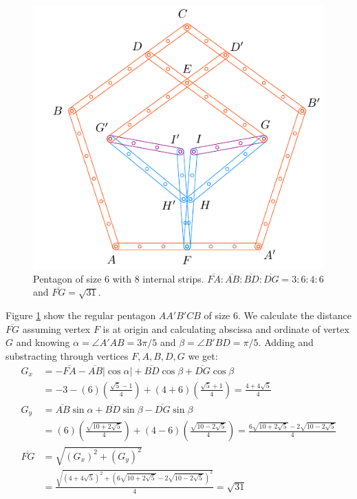 \documentclass[11pt]{article}
\begin{document}
\begin{figure}[H]
\centering
\includegraphics[scale=1.2]{6/penta6-8b}
\caption{Pentagon of size 6 with 8 internal strips. $\overline{FA} : \overline{AB} : \overline{BD} : \overline{DG} = 3:6:4:6$ and $\overline{FG} = \sqrt{31}$.}
\label{fig:penta6-8b}
\end{figure}

Figure \ref{fig:penta6-8b} show the regular pentagon $AA'B'CB$ of size $6$. We calculate the distance $\overline{FG}$ assuming vertex $F$ is at origin and calculating abscissa and ordinate of vertex $G$ and knowing $\alpha = \angle{A'AB} = 3\pi / 5$ and $\beta = \angle{B'BD} = \pi / 5$. Adding and substracting through vertices $F,A,B,D,G$ we get:
\begin{align}
G_x &= -\overline{FA} -\overline{AB}|\cos\alpha| + \overline{BD}\cos\beta + \overline{DG}\cos\beta \nonumber\\
 &= -3 -(6)\left(\frac{\sqrt5 - 1}4\right) + (4+6)\left(\frac{\sqrt5+1}4\right)
 = \frac{4 + 4\sqrt5}4 \\
G_y &= \overline{AB}\sin\alpha + \overline{BD}\sin\beta - \overline{DG}\sin\beta \nonumber\\
 &= (6)\left(\frac{\sqrt{10+2\sqrt5}}4\right) + (4-6)\left(\frac{\sqrt{10-2\sqrt5}}4\right)
 = \frac{6\sqrt{10+2\sqrt5} - 2\sqrt{10-2\sqrt5}}4 \\
%
\overline{FG} &= \sqrt{(G_x)^2 + (G_y)^2} \nonumber\\
 &= \frac{\sqrt{(4+4\sqrt5)^2 + (6\sqrt{10+2\sqrt5} -2\sqrt{10-2\sqrt5})^2}}4
 = \sqrt{31}
\end{align}
\end{document}
